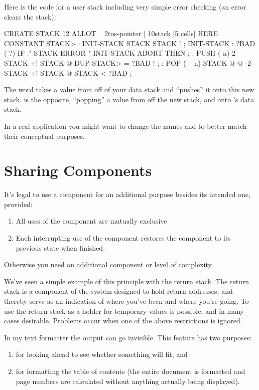 Here is the code for a user stack including very simple error checking
(an error clears the stack):

\begin{Code}
CREATE STACK  12 ALLOT  \  { 2tos-pointer | 10stack [5 cells] }
HERE CONSTANT STACK>
: INIT-STACK   STACK STACK ! ;   INIT-STACK
: ?BAD  ( ?)   IF ." STACK ERROR "  INIT-STACK  ABORT  THEN ;
: PUSH  ( n)   2 STACK +!  STACK @  DUP  STACK> = ?BAD  ! ;
: POP  ( -- n)  STACK @ @  -2 STACK +!  STACK @ STACK < ?BAD ;
\end{Code}
The word  takes a value from off of your data stack and ``pushes''
it onto this new stack.  is the opposite, ``popping'' a value from off
the new stack, and onto \Forth{}'s data stack.

In a real application you might want to change the names 
and  to better match their conceptual purposes.

\section{Sharing Components}%
%
\begin{tip}
It's legal to use a component for an additional purpose besides its intended
one, provided:
\medskip
\begin{enumerate}
\item All uses of the component are mutually exclusive
\item Each interrupting use of the component restores the component to
   its previous state when finished.
\end{enumerate}
\medskip\noindent
Otherwise you need an additional component or level of complexity.
\end{tip}%
We've seen a simple example of this principle with the return stack. The
return stack is a component of the \Forth{} system designed to hold
return addresses, and thereby serve as an indication of where you've been
and where you're going. To use the return stack as a holder for temporary
values is possible, and in many cases desirable. Problems occur when one
of the above restrictions is ignored.%

In my text formatter the output can go invisible. This feature has
two purposes: 
\begin{enumerate}
\item for looking ahead to see whether something will fit, and
\item for formatting the table of contents (the entire document is formatted
and page numbers are calculated without anything actually being
displayed).
\end{enumerate}

